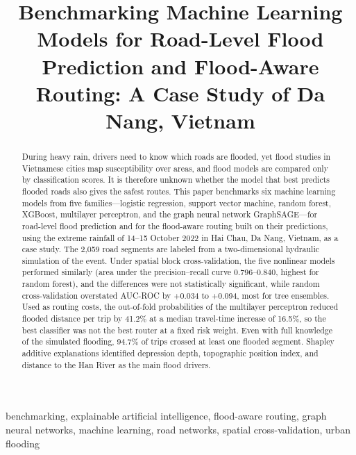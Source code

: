 \documentclass[conference]{IEEEtran}
\begin{document}
\title{Benchmarking Machine Learning Models for Road-Level Flood Prediction and Flood-Aware Routing: A Case Study of Da Nang, Vietnam}

\author{
}

\maketitle

\begin{abstract}
During heavy rain, drivers need to know which roads are flooded, yet flood studies in Vietnamese cities map susceptibility over areas, and flood models are compared only by classification scores. It is therefore unknown whether the model that best predicts flooded roads also gives the safest routes. This paper benchmarks six machine learning models from five families---logistic regression, support vector machine, random forest, XGBoost, multilayer perceptron, and the graph neural network GraphSAGE---for road-level flood prediction and for the flood-aware routing built on their predictions, using the extreme rainfall of 14--15 October 2022 in Hai Chau, Da Nang, Vietnam, as a case study. The 2,059 road segments are labeled from a two-dimensional hydraulic simulation of the event. Under spatial block cross-validation, the five nonlinear models performed similarly (area under the precision--recall curve 0.796--0.840, highest for random forest), and the differences were not statistically significant, while random cross-validation overstated AUC-ROC by +0.034 to +0.094, most for tree ensembles. Used as routing costs, the out-of-fold probabilities of the multilayer perceptron reduced flooded distance per trip by 41.2\% at a median travel-time increase of 16.5\%, so the best classifier was not the best router at a fixed risk weight. Even with full knowledge of the simulated flooding, 94.7\% of trips crossed at least one flooded segment. Shapley additive explanations identified depression depth, topographic position index, and distance to the Han River as the main flood drivers.
\end{abstract}

\begin{IEEEkeywords}
benchmarking, explainable artificial intelligence, flood-aware routing, graph neural networks, machine learning, road networks, spatial cross-validation, urban flooding
\end{IEEEkeywords}
\end{document}
